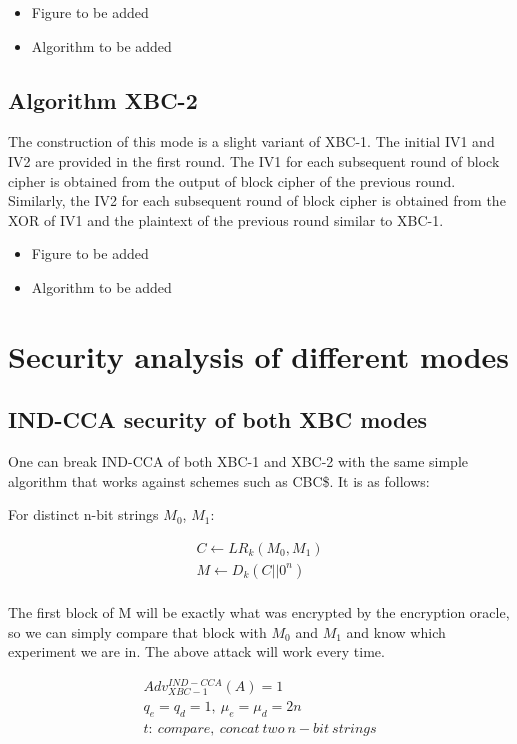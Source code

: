 \documentclass[conference]{IEEEtran}
\begin{document}
\begin{itemize}
\color{red}
\item Figure to be added
\item Algorithm to be added
\end{itemize}

\subsection{Algorithm XBC-2}

The construction of this mode is a slight variant of XBC-1. The initial IV1 and IV2 are provided in the first round. The IV1 for each subsequent round of block cipher is obtained from the output of block cipher of the previous round. Similarly, the IV2 for each subsequent round of block cipher is obtained from the XOR of IV1 and the plaintext of the previous round similar to XBC-1.

\begin{itemize}
\color{red}
\item Figure to be added
\item Algorithm to be added
\end{itemize}

\section{Security analysis of different modes}

\subsection{IND-CCA security of both XBC modes}
One can break IND-CCA of both XBC-1 and XBC-2 with the same simple algorithm that works against schemes such as CBC\$. It is as follows:

For distinct n-bit strings $M_0$, $M_1$:

\begin{gather*}
  C \leftarrow LR_k (M_0, M_1) \\
  M \leftarrow D_k (C || 0^n) \\
\end{gather*}

The first block of M will be exactly what was encrypted by the encryption oracle, so we can simply compare that block with $M_0$ and $M_1$ and know which experiment we are in. The above attack will work every time.

\begin{gather*}
  Adv_{XBC-1}^{IND-CCA}(A) = 1 \\
  q_e=q_d=1,\ \mu_e = \mu_d = 2n \\
  t:\ compare,\ concat\ two\ n-bit\ strings \\
\end{gather*}
\end{document}
